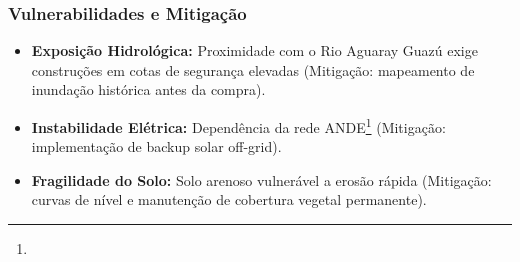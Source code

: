 \subsubsection{Vulnerabilidades e
Mitigação}

\begin{itemize}
\tightlist
\item
  \textbf{Exposição Hidrológica:} Proximidade com o Rio Aguaray Guazú
  exige construções em cotas de segurança elevadas (Mitigação:
  mapeamento de inundação histórica antes da compra).
\item
  \textbf{Instabilidade Elétrica:} Dependência da rede ANDE\footnote{\fineANDE} (Mitigação:
  implementação de backup solar off-grid).
\item
  \textbf{Fragilidade do Solo:} Solo arenoso vulnerável a erosão rápida
  (Mitigação: curvas de nível e manutenção de cobertura vegetal
  permanente).
\end{itemize}

